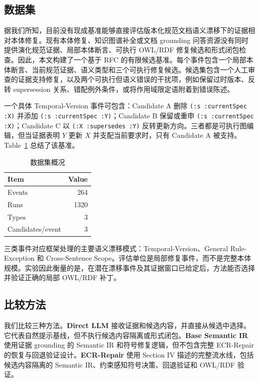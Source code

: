 \documentclass[conference]{IEEEtran}
\begin{document}
\subsection{数据集}

据我们所知，目前没有现成基准能够直接评估版本化规范文档语义漂移下的证据相对本体修复。现有本体修复、知识图谱补全或文档 grounding 问答资源没有同时提供演化规范证据、局部本体断言、可执行 OWL/RDF 修复候选和形式闭包检查。因此，本文构建了一个基于 RFC 的有限候选基准。每个事件包含一个局部本体断言、当前规范证据、语义类型和三个可执行修复候选。候选集包含一个人工审查的证据支持修复，以及两个可执行但语义错误的干扰项，例如保留过时版本、反转 supersession 关系、错配例外条件，或将作用域限定语附着到错误陈述。

一个具体 Temporal-Version 事件可包含：Candidate A 删除 \texttt{(:s :currentSpec :X)} 并添加 \texttt{(:s :currentSpec :Y)}；Candidate B 保留或重申 \texttt{(:s :currentSpec :X)}；Candidate C 以 \texttt{(:X :supersedes :Y)} 反转更新方向。三者都是可执行图编辑，但当证据表明 $Y$ 更新 $X$ 并支配当前要求时，只有 Candidate A 被支持。Table~\ref{tab:dataset} 总结了该基准。

\begin{table}[t]
\centering
\caption{数据集概况}
\label{tab:dataset}
\begin{tabular}{lr}
\toprule
Item & Value \\
\midrule
Events & 264 \\
Runs & 1320 \\
Types & 3 \\
Candidates/event & 3 \\
\bottomrule
\end{tabular}
\end{table}

三类事件对应框架处理的主要语义漂移模式：Temporal-Version、General Rule-Exception 和 Cross-Sentence Scope。评估单位是局部修复事件，而不是完整本体规模。实验因此衡量的是，在潜在漂移事件及其证据窗口已给定后，方法能否选择并验证正确的局部 OWL/RDF 补丁。

\subsection{比较方法}

我们比较三种方法。\textbf{Direct LLM} 接收证据和候选内容，并直接从候选中选择。它代表自然提示基线，但不执行候选内容隔离或形式闭包。\textbf{Base Semantic IR} 使用证据 grounding 的 Semantic IR 和符号修复逻辑，但不包含完整 ECR-Repair 的恢复与回退验证设计。\textbf{ECR-Repair} 使用 Section IV 描述的完整流水线，包括候选内容隔离的 Semantic IR、约束感知符号决策、回退验证和 OWL/RDF 验证。
\end{document}
